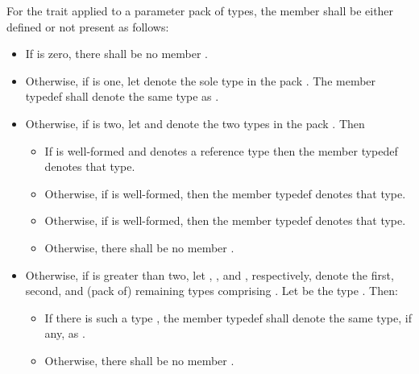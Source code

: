 {\color{newclr}
\pnum
For the  trait applied to a parameter pack  of
types, the member  shall be either defined or not present as follows:
\begin{itemize}
\item If  is zero, there shall be no member .
\item Otherwise, if  is one, let  denote the sole
  type in the pack . The member typedef  shall denote the
  same type as .
\item Otherwise, if  is two, let  and 
  denote the two types in the pack . Then
\begin{itemize}
\item If  is well-formed and denotes a reference type
  then the member typedef  denotes that type.
\item Otherwise, if  is well-formed, then the member typedef
   denotes that type.
\item Otherwise, if  is well-formed, then the
  member typedef  denotes that type.
\item Otherwise, there shall be no member .
\end{itemize}
\item Otherwise, if  is greater than two, let ,
  , and , respectively, denote the first, second, and
  (pack of) remaining types comprising . Let  be the type
  . Then:
\begin{itemize}
\item If there is such a type , the member typedef  shall
  denote the same type, if any, as .
\item Otherwise, there shall be no member .
\end{itemize}
\end{itemize}
} %

